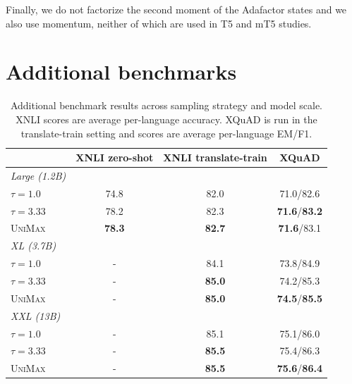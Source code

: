 \documentclass{article} %
\newcommand{\unimax}{\textsc{UniMax}}
\begin{document}
Finally, we do not factorize the second moment of the Adafactor states and we also use momentum, neither of which are used in T5 and mT5 studies.

\section{Additional benchmarks}
\label{sec:additional_benchmarks}

\begin{table}[]
\caption{Additional benchmark results across sampling strategy and model scale. XNLI scores are average per-language accuracy. XQuAD is run in the translate-train setting and scores are average per-language EM/F1.}
\label{table:additional_benchmarks}
\begin{center}
\begin{tabular}{lccc}
\toprule
 &
  XNLI zero-shot &
  XNLI translate-train &
  XQuAD \\
  \midrule
\textit{Large (1.2B)} &
  \multicolumn{1}{l}{} &
  \multicolumn{1}{l}{} &  
  \multicolumn{1}{l}{} \\
  \midrule
$\tau=1.0$ & 74.8 & 82.0 & 71.0/82.6 \\
$\tau=3.33$ & 78.2 & 82.3 & \textbf{71.6}/\textbf{83.2} \\
\unimax{} & \textbf{78.3} & \textbf{82.7} & \textbf{71.6}/83.1 \\

  \midrule
\textit{XL (3.7B)} &
  \multicolumn{1}{l}{} &
  \multicolumn{1}{l}{} &
  \multicolumn{1}{l}{} \\
  \midrule
$\tau=1.0$ & - & 84.1 & 73.8/84.9 \\
$\tau=3.33$ & - & \textbf{85.0} & 74.2/85.3 \\
\unimax{} & - & \textbf{85.0} & \textbf{74.5}/\textbf{85.5} \\

\midrule
\textit{XXL (13B)} &
  \multicolumn{1}{l}{} &
  \multicolumn{1}{l}{} &
  \multicolumn{1}{l}{} \\
  \midrule
$\tau=1.0$ & - & 85.1 & 75.1/86.0 \\
$\tau=3.33$ & - & \textbf{85.5} & 75.4/86.3 \\
\unimax{} & - & \textbf{85.5} & \textbf{75.6}/\textbf{86.4} \\
\bottomrule
\end{tabular}
\end{center}
\end{table}
\end{document}
